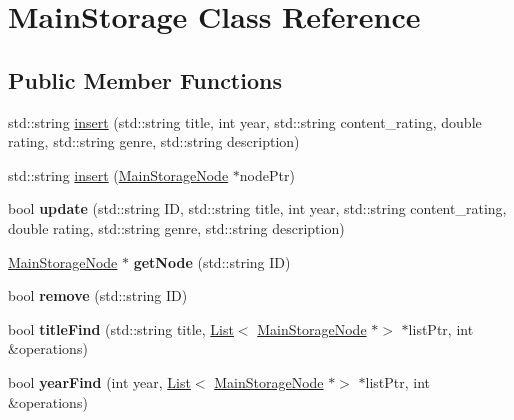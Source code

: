 \hypertarget{class_main_storage}{}\section{Main\+Storage Class Reference}
\label{class_main_storage}
\subsection*{Public Member Functions}
\begin{DoxyCompactItemize}
\item 
std\+::string \hyperlink{class_main_storage_a44c622afdd8c4c8a897394587d08348c}{insert} (std\+::string title, int year, std\+::string content\+\_\+rating, double rating, std\+::string genre, std\+::string description)
\item 
std\+::string \hyperlink{class_main_storage_a474a036747ca2b6e9082e199eea14510}{insert} (\hyperlink{class_main_storage_node}{Main\+Storage\+Node} $\ast$node\+Ptr)
\item 
\mbox{\label{class_main_storage_a671382444b8ef74cee4f40b250abf48c}} 
bool {\bfseries update} (std\+::string ID, std\+::string title, int year, std\+::string content\+\_\+rating, double rating, std\+::string genre, std\+::string description)
\item 
\mbox{\label{class_main_storage_a2b4e41b68af000474264b89e37fe2c07}} 
\hyperlink{class_main_storage_node}{Main\+Storage\+Node} $\ast$ {\bfseries get\+Node} (std\+::string ID)
\item 
\mbox{\label{class_main_storage_a673ae2af870359aaaf9ae60a4be4974d}} 
bool {\bfseries remove} (std\+::string ID)
\item 
\mbox{\label{class_main_storage_a76cc264ecdf371b16ebf57bd3be1476e}} 
bool {\bfseries title\+Find} (std\+::string title, \hyperlink{class_list}{List}$<$ \hyperlink{class_main_storage_node}{Main\+Storage\+Node} $\ast$$>$ $\ast$list\+Ptr, int \&operations)
\item 
\mbox{\label{class_main_storage_a7e97295155ad6b7b4d4d77bd210f10cc}} 
bool {\bfseries year\+Find} (int year, \hyperlink{class_list}{List}$<$ \hyperlink{class_main_storage_node}{Main\+Storage\+Node} $\ast$$>$ $\ast$list\+Ptr, int \&operations)

\end{DoxyCompactItemize}

